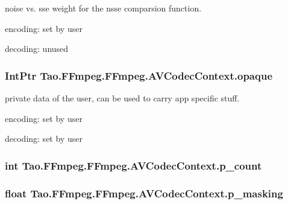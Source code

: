 \label{struct_tao_1_1_f_fmpeg_1_1_f_fmpeg_1_1_a_v_codec_context_ada6d5e69e5a1b09065fef8645cc4f3ab}
noise vs. sse weight for the nsse comparsion function.
\begin{DoxyItemize}
\item encoding: set by user
\item decoding: unused 
\end{DoxyItemize}\hypertarget{struct_tao_1_1_f_fmpeg_1_1_f_fmpeg_1_1_a_v_codec_context_a2af2d58649f2a6bf84853f09e707d441}{
\subsubsection[{opaque}]{\setlength{\rightskip}{0pt plus 5cm}IntPtr {\bf Tao.FFmpeg.FFmpeg.AVCodecContext.opaque}}}
\label{struct_tao_1_1_f_fmpeg_1_1_f_fmpeg_1_1_a_v_codec_context_a2af2d58649f2a6bf84853f09e707d441}
private data of the user, can be used to carry app specific stuff.
\begin{DoxyItemize}
\item encoding: set by user
\item decoding: set by user 
\end{DoxyItemize}\hypertarget{struct_tao_1_1_f_fmpeg_1_1_f_fmpeg_1_1_a_v_codec_context_a84c6631ce7c297c8d2e74ad6dec92a4c}{
\subsubsection[{p\_\-count}]{\setlength{\rightskip}{0pt plus 5cm}int {\bf Tao.FFmpeg.FFmpeg.AVCodecContext.p\_\-count}}}
\label{struct_tao_1_1_f_fmpeg_1_1_f_fmpeg_1_1_a_v_codec_context_a84c6631ce7c297c8d2e74ad6dec92a4c}
\hypertarget{struct_tao_1_1_f_fmpeg_1_1_f_fmpeg_1_1_a_v_codec_context_aef8a2bdbe812842fb2035c13ce41ed21}{
\subsubsection[{p\_\-masking}]{\setlength{\rightskip}{0pt plus 5cm}float {\bf Tao.FFmpeg.FFmpeg.AVCodecContext.p\_\-masking}}}
